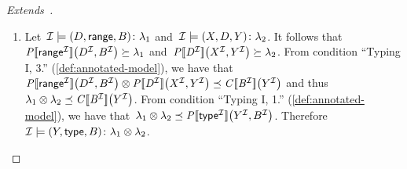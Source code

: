 \begin{proof}[Extends~\citep{MunozPerezGutierrez:2009aa}]
\begin{description}[nosep]
\begin{enumerate}[label=(\alph*),nosep]
    \item Let~$\mathcal{I} \models \mbox{$(D, \mathsf{range}, B)\colon\lambda_{1}$}$ and~$\mathcal{I} \models \mbox{$(X, D,
          Y)\colon\lambda_{2}$}$.
      It follows that~$\mathit{{P[\![{\mathsf{range}}^{\mathcal{I}}]\!]}}\!\left({D}^{\mathcal{I}}, {B}^{\mathcal{I}}\right) \succeq \lambda_{1}$ and~$\mathit{{P[\![{D}^{\mathcal{I}}]\!]}}\!\left({X}^{\mathcal{I}},
        {Y}^{\mathcal{I}}\right) \succeq \lambda_{2}$.
      From condition ``Typing I, 3.'' (\cref{def:annotated-model}), we have that~$\fc{\intP{\int{\range}}}{\int{D},
        \int{B}} \otimes \fc{\intP{\int{D}}}{\int{X}, \int{Y}} \preceq \fc{\intC{\int{B}}}{\int{Y}}$ and
      thus~$\lambda_{1} \otimes \lambda_{2} \preceq \mathit{{C[\![{B}^{\mathcal{I}}]\!]}}\!\left({Y}^{\mathcal{I}}\right)$.
      From condition ``Typing I, 1.'' (\cref{def:annotated-model}), we have that~$\lambda_{1} \otimes \lambda_{2}
      \preceq \mathit{{P[\![{\mathsf{type}}^{\mathcal{I}}]\!]}}\!\left({Y}^{\mathcal{I}},{B}^{\mathcal{I}}\right)$.
      Therefore~$\mathcal{I} \models \mbox{$(Y, \mathsf{type}, B)\colon\lambda_{1} \otimes \lambda_{2}$}$.


\end{enumerate}
\end{description}
\end{proof}
